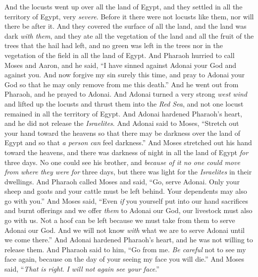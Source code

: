 \begin{biblechapter}
\verse And the locusts went up over all the land of Egypt, and they settled in all the territory of Egypt, very \textit{severe}. Before it there were not locusts like them, nor will there be after it.
\verse And they covered the surface of all the land, and the land was dark \textit{with them}, and they ate all the vegetation of the land and all the fruit of the trees that the hail had left, and no green was left in the trees nor in the vegetation of the field in all the land of Egypt.
\verse And Pharaoh hurried to call Moses and Aaron, and he said, “I have sinned against Adonai your God and against you.
\verse And now forgive my sin surely this time, and pray to Adonai your God so that he may only remove from me this death.”
\verse And he went out from Pharaoh, and he prayed to Adonai.
\verse And Adonai turned a very strong \textit{west wind} and lifted up the locusts and thrust them into the \textit{Red Sea}, and not one locust remained in all the territory of Egypt.
\verse And Adonai hardened Pharaoh’s heart, and he did not release the \textit{Israelites}.
 And Adonai said to Moses, “Stretch out your hand toward the heavens so that there may be darkness over the land of Egypt and so that \textit{a person can} feel darkness.”
\verse And Moses stretched out his hand toward the heavens, and there was darkness of night in all the land of Egypt \textit{for} three days.
\verse No one could see his brother, and \textit{because of it no one could move from where they were} \textit{for} three days, but there was light for the \textit{Israelites} in their dwellings.
\verse And Pharaoh called Moses and said, “Go, serve Adonai. Only your sheep and goats and your cattle must be left behind. Your dependents may also go with you.”
\verse And Moses said, “Even \textit{if} you yourself put into our hand sacrifices and burnt offerings and we offer \textit{them} to Adonai our God,
\verse our livestock must also go with us. Not a hoof can be left because we must take from them to serve Adonai our God. And we will not know \textit{with} what we are to serve Adonai until we come there.”
\verse And Adonai hardened Pharaoh’s heart, and he was not willing to release them.
\verse And Pharaoh said to him, “Go from me. \textit{Be careful} not to see my face again, because on the day of your seeing my face you will die.”
\verse And Moses said, “\textit{That is right}. \textit{I will not again see your face}.”
\end{biblechapter}

